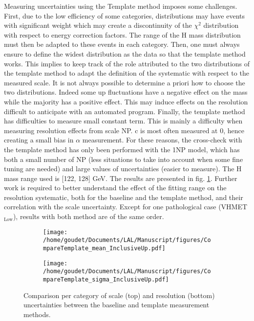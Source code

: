 \begin{enumerate}
\begin{enumerate}
Measuring uncertainties using the Template method imposes some challenges.
First, due to the low efficiency of some categories, distributions may have events with significant weight which may create a discontinuity of the \(\chi^{\text{2}}\) distribution with respect to energy correction factors.
The range of the H mass distribution must then be adapted to these events in each category.
Then, one must always ensure to define the widest distribution as the data so that the template method works.
This implies to keep track of the role attributed to the two distributions of the template method to adapt the definition of the systematic with respect to the measured scale.
It is not always possible to determine a priori how to choose the two distributions.
Indeed some up fluctuations have a negative effect on the mass while the majority has a positive effect.
This may induce effects on the resolution difficult to anticipate with an automated program.
Finally, the template method has difficulties to measure small constant term.
This is mainly a difficulty when measuring resolution effects from scale NP.
c is most often measured at 0, hence creating a small bias in $\alpha$ measurement.
For these reasons, the cross-check with the template method has only been performed with the 1NP model, which has both a small number of NP (less situations to take into account when some fine tuning are needed) and large values of uncertainties (easier to measure).
The H mass range used is [122, 128] GeV.
The results are presented in fig. \ref{orgff41d01}.
Further work is required to better understand the effect of the fitting range on the resolution systematic, both for the baseline and the template method, and their correlation with the scale uncertainty.
Except for one pathological case (VHMET\(_{\text{Low}}\)), results with both method are of the same order.

\begin{figure}
\begin{subfigure}[t]{\linewidth}
\begin{center}
\texttt{[image: /home/goudet/Documents/LAL/Manuscript/figures/CompareTemplate\_mean\_InclusiveUp.pdf]}
\end{center}
\end{subfigure}
\begin{subfigure}[t]{\linewidth}
\begin{center}
\texttt{[image: /home/goudet/Documents/LAL/Manuscript/figures/CompareTemplate\_sigma\_InclusiveUp.pdf]}
\end{center}
\end{subfigure}
\caption{\label{orgff41d01}
Comparison per category of scale (top) and resolution (bottom) uncertainties between the baseline and template measurement methods.}
\end{figure}



\end{enumerate}
\end{enumerate}
